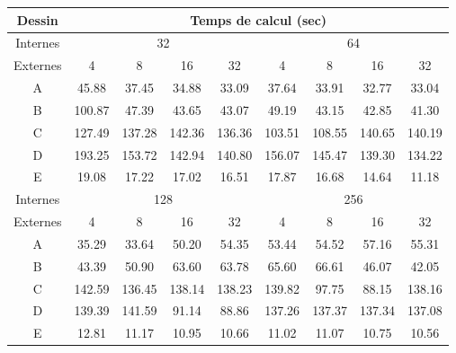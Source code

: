 				\begin{table}
					\tiny
					\label{boxdepthr1}
					\begin{tabular*}{\textwidth}{@{\extracolsep{\fill}} | c || c | c | c | c | c | c | c | c | }
						\hline
						Dessin & \multicolumn{8}{c|}{Temps de calcul (sec)} \\
						\hline
						\BO Internes 	& \multicolumn{4}{c|}{32}					&  \multicolumn{4}{c|}{64}	\\					
						\hline
						\BO Externes	& 4		&  8		&  16		&  32		&  4		&  8		&  16		&  32		       \\
						\hline
						A		& 45.88		&  37.45	&  34.88	&  33.09	&  37.64	&  33.91	&  32.77	&  33.04	       \\
						B 		& 100.87	&  47.39	&  43.65	&  43.07	&  49.19	&  43.15	&  42.85	&  41.30	       \\
						C 		& 127.49	&  137.28	&  142.36	&  136.36	&  103.51	&  108.55	&  140.65	&  140.19		\\
						D		& 193.25	&  153.72	&  142.94	&  140.80	&  156.07	&  145.47	&  139.30	&  134.22		\\
						E		& 19.08		&  17.22	&  17.02	&  16.51	&  17.87	&  16.68	&  14.64	&  11.18	       \\
						\hline
						\BO Internes 	&  \multicolumn{4}{c|}{128}					& \multicolumn{4}{c|}{256}   \\
						\hline
						\BO Externes	&  4 		&  8		&  16		&  32		&  4		&  8		& 16		&  32		\\
						\hline
						A		&  35.29	&  33.64	&  50.20	&  54.35	&  53.44	&  54.52	&  57.16	&  55.31	\\
						B 		&  43.39	&  50.90	&  63.60	&  63.78	&  65.60	&  66.61	&  46.07	&  42.05	\\
						C 		&  142.59	&  136.45	&  138.14	&  138.23	&  139.82	&  97.75	&  88.15	&  138.16	\\
						D		&  139.39	&  141.59	&  91.14	&  88.86	&  137.26	&  137.37	&  137.34	&  137.08	\\
						E		&  12.81	&  11.17	&  10.95	&  10.66	&  11.02	&  11.07	&  10.75	&  10.56	\\
						\hline
					\end{tabular*}
				\end{table}
